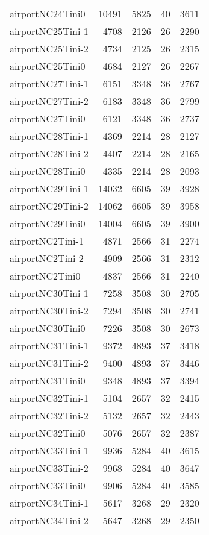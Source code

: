 \documentclass[../../../thesis.tex]{subfiles}
\begin{document}
\begin{longtable}{lrrrr}
airportNC24Tini0 & 10491 & 5825 & 40 & 3611 \\
airportNC25Tini-1 & 4708 & 2126 & 26 & 2290 \\
airportNC25Tini-2 & 4734 & 2125 & 26 & 2315 \\
airportNC25Tini0 & 4684 & 2127 & 26 & 2267 \\
airportNC27Tini-1 & 6151 & 3348 & 36 & 2767 \\
airportNC27Tini-2 & 6183 & 3348 & 36 & 2799 \\
airportNC27Tini0 & 6121 & 3348 & 36 & 2737 \\
airportNC28Tini-1 & 4369 & 2214 & 28 & 2127 \\
airportNC28Tini-2 & 4407 & 2214 & 28 & 2165 \\
airportNC28Tini0 & 4335 & 2214 & 28 & 2093 \\
airportNC29Tini-1 & 14032 & 6605 & 39 & 3928 \\
airportNC29Tini-2 & 14062 & 6605 & 39 & 3958 \\
airportNC29Tini0 & 14004 & 6605 & 39 & 3900 \\
airportNC2Tini-1 & 4871 & 2566 & 31 & 2274 \\
airportNC2Tini-2 & 4909 & 2566 & 31 & 2312 \\
airportNC2Tini0 & 4837 & 2566 & 31 & 2240 \\
airportNC30Tini-1 & 7258 & 3508 & 30 & 2705 \\
airportNC30Tini-2 & 7294 & 3508 & 30 & 2741 \\
airportNC30Tini0 & 7226 & 3508 & 30 & 2673 \\
airportNC31Tini-1 & 9372 & 4893 & 37 & 3418 \\
airportNC31Tini-2 & 9400 & 4893 & 37 & 3446 \\
airportNC31Tini0 & 9348 & 4893 & 37 & 3394 \\
airportNC32Tini-1 & 5104 & 2657 & 32 & 2415 \\
airportNC32Tini-2 & 5132 & 2657 & 32 & 2443 \\
airportNC32Tini0 & 5076 & 2657 & 32 & 2387 \\
airportNC33Tini-1 & 9936 & 5284 & 40 & 3615 \\
airportNC33Tini-2 & 9968 & 5284 & 40 & 3647 \\
airportNC33Tini0 & 9906 & 5284 & 40 & 3585 \\
airportNC34Tini-1 & 5617 & 3268 & 29 & 2320 \\
airportNC34Tini-2 & 5647 & 3268 & 29 & 2350 \\

\end{longtable}
\end{document}
